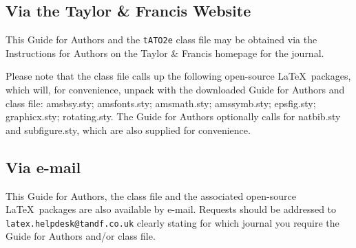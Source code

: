 \documentclass{tATO2e}
\begin{document}
\subsection{Via the Taylor \& Francis Website}

This Guide for Authors and the \texttt{tATO2e} class file may be obtained via the Instructions for Authors
on the Taylor \& Francis homepage for the journal.

Please note that the class file calls up the following open-source \LaTeX\ packages, which will, for convenience,
unpack with the downloaded Guide for Authors and class file: amsbsy.sty; amsfonts.sty; amsmath.sty; amssymb.sty; epsfig.sty; graphicx.sty; rotating.sty.
The Guide for Authors optionally calls for natbib.sty and subfigure.sty, which are also supplied for convenience.


\subsection{Via e-mail}

This Guide for Authors, the class file and the associated open-source \LaTeX\ packages are also available by
e-mail. Requests should be addressed to {\tt latex.helpdesk@tandf.co.uk} clearly stating for which journal you
require the Guide for Authors and/or class file.
\end{document}
